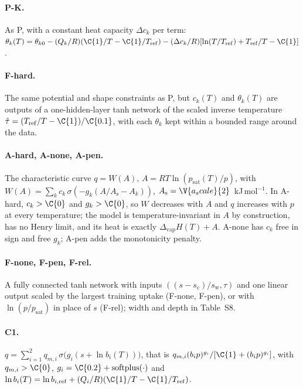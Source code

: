 \documentclass[11pt]{article}
\begin{document}
\paragraph{P-K.} As P, with a constant heat capacity $\Delta c_k$ per term:
$\theta_k(T) = \theta_{k0} - (Q_k/R)(\C{1}/T - \C{1}/T_{\mathrm{ref}}) - (\Delta c_k/R)[\ln(T/T_{\mathrm{ref}}) +
T_{\mathrm{ref}}/T - \C{1}]$.

\paragraph{F-hard.} The same potential and shape constraints as P, but $c_k(T)$ and $\theta_k(T)$ are outputs of a
one-hidden-layer tanh network of the scaled inverse temperature $\hat\tau = (T_{\mathrm{ref}}/T - \C{1})/\C{0.1}$,
with each $\theta_k$ kept within a bounded range around the data.

\paragraph{A-hard, A-none, A-pen.} The characteristic curve $q = W(A)$, $A = RT\ln(p_{\mathrm{sat}}(T)/p)$, with
$W(A) = \sum_k c_k\,\sigma(-g_k(A/A_{\mathrm{s}} - A_k))$, $A_{\mathrm{s}} = \V{a_scale}{2}$~kJ\,mol$^{-1}$. In
A-hard, $c_k > \C{0}$ and $g_k > \C{0}$, so $W$ decreases with $A$ and $q$ increases with $p$ at every temperature;
the model is temperature-invariant in $A$ by construction, has no Henry limit, and its heat is exactly
$\Delta_{\mathrm{vap}}H(T) + A$. A-none has $c_k$ free in sign and free $g_k$; A-pen adds the monotonicity penalty.

\paragraph{F-none, F-pen, F-rel.} A fully connected tanh network with inputs
$((s - s_{\mathrm{c}})/s_{\mathrm{w}}, \hat\tau)$ and one linear output scaled by the largest training uptake
(F-none, F-pen), or with $\ln(p/p_{\mathrm{sat}})$ in place of $s$ (F-rel); width and depth in Table~S8.

\paragraph{C1.} $q = \sum_{i=1}^{2} q_{m,i}\,\sigma\bigl(g_i(s + \ln b_i(T))\bigr)$, that is
$q_{m,i}(b_ip)^{g_i}/[\C{1}+(b_ip)^{g_i}]$, with $q_{m,i} > \C{0}$, $g_i = \C{0.2} + \mathrm{softplus}(\cdot)$ and
$\ln b_i(T) = \ln b_{i,\mathrm{ref}} + (Q_i/R)(\C{1}/T - \C{1}/T_{\mathrm{ref}})$.
\end{document}
